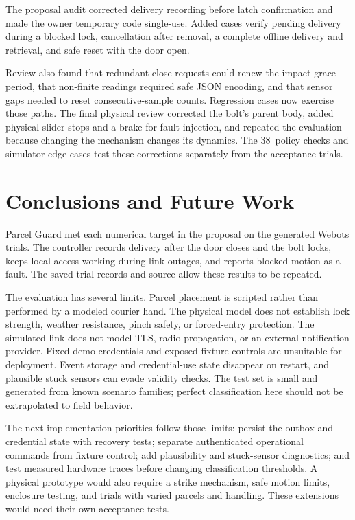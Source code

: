 \documentclass[conference,letterpaper]{IEEEtran}
\newcommand{\Regressions}{38}
\begin{document}
The proposal audit corrected delivery recording before latch confirmation and made the owner temporary code single-use. Added cases verify pending delivery during a blocked lock, cancellation after removal, a complete offline delivery and retrieval, and safe reset with the door open.

Review also found that redundant close requests could renew the impact grace period, that non-finite readings required safe JSON encoding, and that sensor gaps needed to reset consecutive-sample counts. Regression cases now exercise those paths. The final physical review corrected the bolt's parent body, added physical slider stops and a brake for fault injection, and repeated the evaluation because changing the mechanism changes its dynamics. The \Regressions\ policy checks and simulator edge cases test these corrections separately from the acceptance trials.

\section{Conclusions and Future Work}
\label{sec:conclusion}
Parcel Guard met each numerical target in the proposal on the generated Webots trials. The controller records delivery after the door closes and the bolt locks, keeps local access working during link outages, and reports blocked motion as a fault. The saved trial records and source allow these results to be repeated.

The evaluation has several limits. Parcel placement is scripted rather than performed by a modeled courier hand. The physical model does not establish lock strength, weather resistance, pinch safety, or forced-entry protection. The simulated link does not model TLS, radio propagation, or an external notification provider. Fixed demo credentials and exposed fixture controls are unsuitable for deployment. Event storage and credential-use state disappear on restart, and plausible stuck sensors can evade validity checks. The test set is small and generated from known scenario families; perfect classification here should not be extrapolated to field behavior.

The next implementation priorities follow those limits: persist the outbox and credential state with recovery tests; separate authenticated operational commands from fixture control; add plausibility and stuck-sensor diagnostics; and test measured hardware traces before changing classification thresholds. A physical prototype would also require a strike mechanism, safe motion limits, enclosure testing, and trials with varied parcels and handling. These extensions would need their own acceptance tests.
\end{document}
